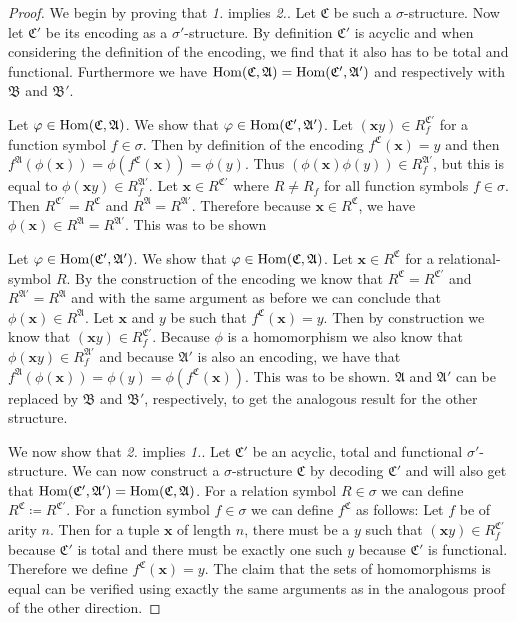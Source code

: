 \begin{proof}
	We begin by proving that \emph{1.} implies \emph{2.}.
	Let $\mathfrak C$ be such a $\sigma$-structure.
	Now let $\mathfrak C'$ be its encoding as a $\sigma'$-structure.
	By definition $\mathfrak C'$ is acyclic and when considering the definition of the encoding, we find that it also has to be total and functional.
	Furthermore we have $\operatorname{Hom}(\mathfrak C,\mathfrak A)=\operatorname{Hom}(\mathfrak C',\mathfrak A')$ and respectively with $\mathfrak B$ and $\mathfrak B'$.
	
	Let $\varphi\in\operatorname{Hom}(\mathfrak C,\mathfrak A)$. 
	We show that $\varphi\in\operatorname{Hom}(\mathfrak C',\mathfrak A')$.
	Let $(\mathbf xy)\in R^{\mathfrak C'}_f$ for a function symbol $f\in\sigma$.
	Then by definition of the encoding $f^{\mathfrak C}(\mathbf x)=y$ and then $f^{\mathfrak A}(\phi(\mathbf x))=\phi(f^{\mathfrak C}(\mathbf x))=\phi(y)$.
	Thus $(\phi(\mathbf x)\phi(y))\in R_f^{\mathfrak A'}$, but this is equal to $\phi(\mathbf xy)\in R_f^{\mathfrak A'}$.
	Let $\mathbf x\in R^{\mathfrak C'}$ where $R\neq R_f$ for all function symbols $f\in\sigma$.
	Then $R^{\mathfrak C'}=R^{\mathfrak C}$ and $R^{\mathfrak A}=R^{\mathfrak A'}$. 
	Therefore because $\mathbf x\in R^{\mathfrak C}$, we have $\phi(\mathbf x)\in R^{\mathfrak A}=R^{\mathfrak A'}$. 
	This was to be shown
	
	Let $\varphi\in \operatorname{Hom}(\mathfrak C',\mathfrak A')$.
	We show that $\varphi\in\operatorname{Hom}(\mathfrak C,\mathfrak A)$.
	Let $\mathbf x\in R^{\mathfrak C}$ for a relational-symbol $R$.
	By the construction of the encoding we know that $R^{\mathfrak C}=R^{\mathfrak C'}$ and $R^{\mathfrak A'}=R^{\mathfrak A}$ and with the same argument as before we can conclude that $\phi(\mathbf x)\in R^{\mathfrak A}$.
	Let $\mathbf x$ and $y$ be such that $f^{\mathfrak C}(\mathbf x)=y$.
	Then by construction we know that $(\mathbf xy)\in R_f^{\mathfrak C'}$.
	Because $\phi$ is a homomorphism we also know that $\phi(\mathbf xy)\in R_f^{\mathfrak A'}$ and because $\mathfrak A'$ is also an encoding, we have that $f^{\mathfrak A}(\phi(\mathbf x))=\phi(y)=\phi(f^{\mathfrak C}(\mathbf x))$.
	This was to be shown.
	$\mathfrak A$ and $\mathfrak A'$ can be replaced by $\mathfrak B$ and $\mathfrak B'$, respectively, to get the analogous result for the other structure.
	
	We now show that \emph{2.} implies \emph{1.}.
	Let $\mathfrak C'$ be an acyclic, total and functional $\sigma'$-structure.
	We can now construct a $\sigma$-structure $\mathfrak C$ by decoding $\mathfrak C'$ and will also get that $\operatorname{Hom}(\mathfrak C',\mathfrak A')=\operatorname{Hom}(\mathfrak C,\mathfrak A)$.
	For a relation symbol $R\in\sigma$ we can define $R^{\mathfrak C}\coloneqq R^{\mathfrak C'}$.
	For a function symbol $f\in\sigma$ we can define $f^{\mathfrak C}$ as follows: 
	Let $f$ be of arity $n$. Then for a tuple $\mathbf x$ of length $n$, there must be a $y$ such that $(\mathbf xy)\in R_f^{\mathfrak C'}$ because $\mathfrak C'$ is total and there must be exactly one such $y$ because $\mathfrak C'$ is functional.
	Therefore we define $f^{\mathfrak C}(\mathbf x)=y$.
	The claim that the sets of homomorphisms is equal can be verified using exactly the same arguments as in the analogous proof of the other direction.
\end{proof}

